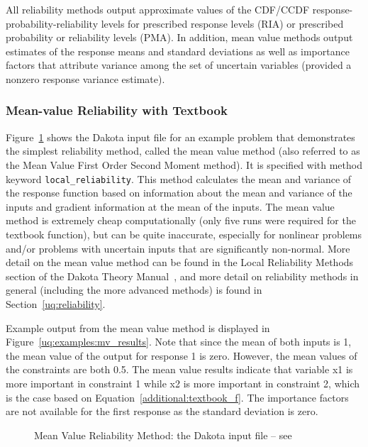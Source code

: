 All reliability methods output approximate values of the CDF/CCDF
response-probability-reliability levels for prescribed response levels
(RIA) or prescribed probability or reliability levels (PMA). In
addition, mean value methods output estimates of the response means
and standard deviations as well as importance factors that attribute
variance among the set of uncertain variables (provided a nonzero
response variance estimate).

\subsubsection{Mean-value Reliability with Textbook}
\label{uq:examples:mv}

Figure~\ref{uq:examples:mv_input} shows the Dakota input file for an
example problem that demonstrates the simplest reliability method,
called the mean value method (also referred to as the Mean Value First
Order Second Moment method). It is specified with method keyword
\texttt{local\_reliability}. This method calculates the mean and
variance of the response function based on information about the mean
and variance of the inputs and gradient information at the mean of the
inputs. The mean value method is extremely cheap computationally (only
five runs were required for the textbook function), but can be quite
inaccurate, especially for nonlinear problems and/or problems with
uncertain inputs that are significantly non-normal. More detail on the
mean value method can be found in the Local Reliability Methods
section of the Dakota Theory Manual~\cite{TheoMan}, and more detail on
reliability methods in general (including the more advanced methods)
is found in Section~\ref{uq:reliability}.

Example output from the mean value method is displayed in
Figure~\ref{uq:examples:mv_results}. Note that since the mean of both
inputs is 1, the mean value of the output for response 1 is zero.
However, the mean values of the constraints are both 0.5.  The mean
value results indicate that variable x1 is more important in
constraint 1 while x2 is more important in constraint 2, which is the
case based on Equation~\ref{additional:textbook_f}.  The importance
factors are not available for the first response as the standard
deviation is zero.

\begin{figure}[htbp!]
  \centering
  \begin{bigbox}
    \begin{small}
    \end{small}
  \end{bigbox}
  \caption{Mean Value Reliability Method: the Dakota input file -- see
    \protect{}
  }
  \label{uq:examples:mv_input}
\end{figure}

